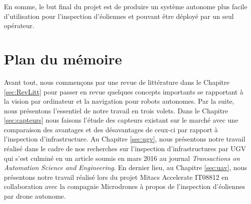 En somme, le but final du projet est de produire un système autonome plus facile d'utilisation pour l'inspection d'éoliennes et pouvant être déployé par un seul opérateur.

\section{Plan du mémoire}

Avant tout, nous commençons par une revue de littérature dans le Chapitre \ref{sec:RevLitt} pour passer en revue quelques concepts importants se rapportant à la vision par ordinateur et la navigation pour robots autonomes. Par la suite, nous présentons l'essentiel de notre travail en trois volets. Dans le Chapitre \ref{sec:capteurs} nous faisons l'étude des capteurs existant sur le marché avec une comparaison des avantages et des désavantages de ceux-ci par rapport à l'inspection d'infrastructure. Au Chapitre \ref{sec:ugv}, nous présentons notre travail réalisé dans le cadre de nos recherches sur l'inspection d'infrastructures par UGV qui s'est culminé en un article soumis en mars 2016 au journal \textit{Transactions on Automation Science and Engineering}. En dernier lieu, au Chapitre \ref{sec:uav}, nous présentons notre travail réalisé lors du projet Mitacs Accelerate IT08812 en collaboration avec la compagnie Microdrones à propos de l'inspection d'éoliennes par drone autonome.



